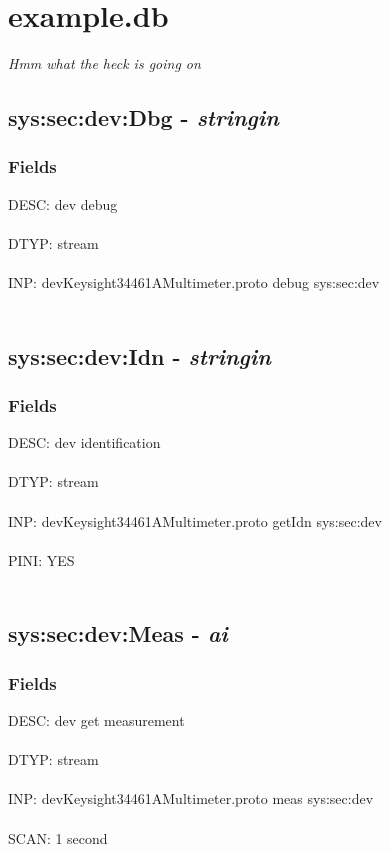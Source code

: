 \documentclass[12pt]{article}
\begin{document}
\section{ example.db }
\textit{Hmm what the heck is going on}
\newpage
\subsection{sys:sec:dev:Dbg - \textit{stringin}}
\subsubsection{Fields}
DESC: dev debug\\\\ DTYP: stream\\\\ INP: devKeysight34461AMultimeter.proto debug sys:sec:dev\\\\ \newpage
\subsection{sys:sec:dev:Idn - \textit{stringin}}
\subsubsection{Fields}
DESC: dev identification\\\\ DTYP: stream\\\\ INP: devKeysight34461AMultimeter.proto getIdn sys:sec:dev\\\\ PINI: YES\\\\ \newpage
\subsection{sys:sec:dev:Meas - \textit{ai}}
\subsubsection{Fields}
DESC: dev get measurement\\\\ DTYP: stream\\\\ INP: devKeysight34461AMultimeter.proto meas sys:sec:dev\\\\ SCAN: 1 second\\\\ \newpage
\end{document}
